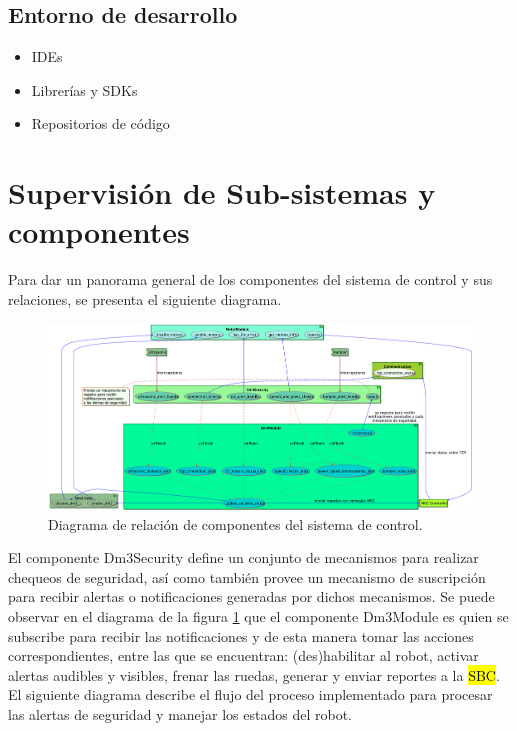 \documentclass[withindex,glossary]{cam-thesis}
\begin{document}
\subsection{Entorno de desarrollo}
\begin{itemize}
    \item IDEs
    \item Librerías y SDKs
    \item Repositorios de código
\end{itemize}
\section{Supervisión de Sub-sistemas y componentes} \label{sec: Implementación :: Supervisión}
Para dar un panorama general de los componentes del sistema de control y sus relaciones, se presenta el siguiente diagrama.

\begin{figure}[H]
\centering
\label{fig: Diagrama_de_subsistema_Dm3Security}
\includegraphics[width=\textwidth]{images/Diagrama_de_subsistema_Dm3Security}
\caption[Diagrama del sub-sistema Dm3Security]{Diagrama de relación de componentes del sistema de control.}
\end{figure}

El componente Dm3Security define un conjunto de mecanismos para realizar chequeos de seguridad, así como también provee un mecanismo de suscripción para recibir alertas o notificaciones generadas por dichos mecanismos. Se puede observar en el diagrama de la figura \ref{fig: Diagrama_de_subsistema_Dm3Security} que el componente Dm3Module es quien se subscribe para recibir las notificaciones y de esta manera tomar las acciones correspondientes, entre las que se encuentran: (des)habilitar al robot, activar alertas audibles y visibles, frenar las ruedas, generar y enviar reportes a la \hl{SBC}.
El siguiente diagrama describe el flujo del proceso implementado para procesar las alertas de seguridad y manejar los estados del robot.
\end{document}

